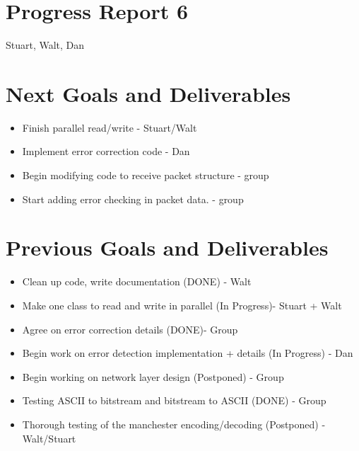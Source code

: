\documentclass{article}
\begin{document}
\section*{Progress Report 6}
Stuart, Walt, Dan

\section*{Next Goals and Deliverables}
\begin{itemize}
    \item Finish parallel read/write - Stuart/Walt
    \item Implement error correction code - Dan
    \item Begin modifying code to receive packet structure - group
    \item Start adding error checking in packet data. - group
\end{itemize}

\section*{Previous Goals and Deliverables}
\begin{itemize}
    \item Clean up code, write documentation (DONE) - Walt
    \item Make one class to read and write in parallel (In Progress)- Stuart + Walt
    \item Agree on error correction details (DONE)- Group
    \item Begin work on error detection implementation + details (In Progress) - Dan
    \item Begin working on network layer design (Postponed) - Group
    \item Testing ASCII to bitstream and bitstream to ASCII (DONE) - Group
    \item Thorough testing of the manchester encoding/decoding (Postponed) - Walt/Stuart
\end{itemize}

\end{document}
